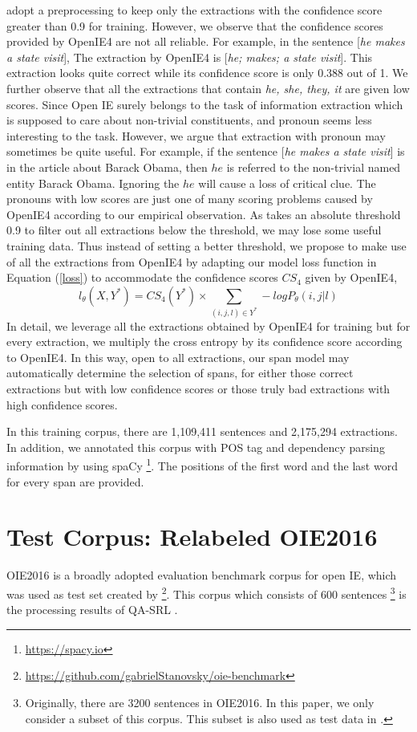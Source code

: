 \documentclass[letterpaper]{article} \usepackage{aaai20}  \usepackage{times}  \usepackage{helvet} \usepackage{courier}  \usepackage[hyphens]{url}  \urlstyle{rm} \def\UrlFont{\rm}  \usepackage{graphicx}  \frenchspacing  \setlength{\pdfpagewidth}{8.5in}  \setlength{\pdfpageheight}{11in}
\begin{document}
\cite{Cui2018NeuralOI} adopt a preprocessing to keep only the extractions with the confidence score greater than 0.9 for training. However, we observe that the confidence scores provided by OpenIE4 are not all reliable. For example, in the sentence [\emph{he makes a state visit}], The extraction by OpenIE4 is [\emph{he; makes; a state visit}]. This extraction looks quite correct while its confidence score is only 0.388 out of 1. We further observe that all the extractions that contain \emph{he, she, they, it} are given low scores. Since Open IE surely belongs to the task of information extraction which is supposed to care about non-trivial constituents, and pronoun seems less interesting to the task. However, we argue that extraction with pronoun may sometimes be quite useful. For example, if the sentence [\emph{he makes a state visit}] is in the article about Barack Obama, then $he$ is referred to the non-trivial named entity Barack Obama. Ignoring the $he$ will cause a loss of critical clue. The pronouns with low scores are just one of many scoring problems caused by OpenIE4 according to our empirical observation. As \cite{Cui2018NeuralOI} takes an absolute threshold 0.9 to filter out all extractions below the threshold, we may lose some useful training data. Thus instead of setting a better threshold, we propose to make use of all the extractions from OpenIE4 by adapting our model loss function in Equation (\ref{loss}) to accommodate the confidence scores $CS_4$ given by OpenIE4, 
\begin{equation}
        l_\theta(X,Y^*)=CS_4(Y^*)\times 
        \sum_{(i,j,l)\in Y^*} -log P_{\theta}(i,j|l)
\end{equation}
In detail, we leverage all the extractions obtained by OpenIE4 for training but for every extraction, we multiply the cross entropy by its confidence score according to OpenIE4. In this way, open to all extractions, our span model may automatically determine the selection of spans, for either those correct extractions but with low confidence scores or those truly bad extractions with high confidence scores. 

In this training corpus, there are 1,109,411 sentences and 2,175,294 extractions. In addition, we annotated this corpus with POS tag and dependency parsing information by using spaCy \footnote{\url{https://spacy.io}}. The positions of the first word and the last word for every span are provided.

\section{Test Corpus: Relabeled OIE2016}
OIE2016 is a broadly adopted evaluation benchmark corpus for open IE, which was used as test set created by \cite{Stanovsky2016CreatingAL}\footnote{\url{https://github.com/gabrielStanovsky/oie-benchmark}}. This corpus which consists of 600 sentences \footnote{Originally, there are 3200 sentences in OIE2016. In this paper, we only consider a subset of this corpus. This subset is also used as test data in \cite{Stanovsky2018SupervisedOI}.} is the processing results of QA-SRL \cite{He2015QuestionAnswerDS}.
\end{document}
